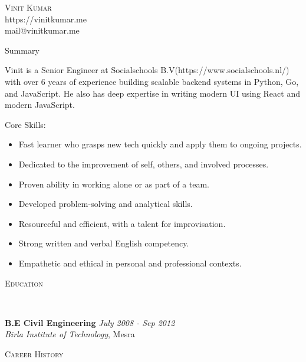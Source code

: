 \documentclass[9pt]{article}
\newenvironment{changemargin}[2]{%
  \begin{list}{}{%
    \setlength{\topsep}{0pt}%
    \setlength{\leftmargin}{#1}%
    \setlength{\rightmargin}{#2}%
    \setlength{\listparindent}{\parindent}%
    \setlength{\itemindent}{\parindent}%
    \setlength{\parsep}{\parskip}%
  }%
  \item[]}{\end{list}
}
\newcommand{\lineover}{
    \begin{changemargin}{-0.05in}{-0.05in}
        \vspace*{-8pt}
        \hrulefill \\
        \vspace*{-2pt}
    \end{changemargin}
}
\newcommand{\header}[1]{
    \begin{changemargin}{-0.5in}{-0.5in}
        \scshape{#1}\\
    \lineover
    \end{changemargin}
}
\newcommand{\contact}[4]{
    \begin{changemargin}{-0.5in}{-0.5in}
        \begin{center}
            {\Large \scshape {#1}}\\ \smallskip
            {#2}\\ \smallskip
            {#3}\\ \smallskip
            {#4}\smallskip
        \end{center}
    \end{changemargin}
}
\newenvironment{body} {
    \vspace*{-16pt}
    \begin{changemargin}{-0.25in}{-0.5in}
  }
    {\end{changemargin}
}
\begin{document}
\contact{Vinit Kumar}{https://vinitkumar.me}{mail@vinitkumar.me}


\header{Summary}

\begin{body}
    \vspace{14pt}
Vinit is a Senior Engineer at Socialschools B.V(https://www.socialschools.nl/) with over 6 years of experience building scalable backend systems in Python, Go, and JavaScript. He also has deep expertise in writing modern UI using React and modern JavaScript.


Core Skills:
\begin{itemize} \itemsep -0pt
    \item Fast learner who grasps new tech quickly and apply them to ongoing projects.
    \item Dedicated to the improvement of self, others, and involved processes.
    \item Proven ability in working alone or as part of a team.
    \item Developed problem-solving and analytical skills.
    \item Resourceful and efficient, with a talent for improvisation.
    \item Strong written and verbal English competency.
    \item Empathetic and ethical in personal and professional contexts.
\end{itemize}

\end{body}

\smallskip


\header{Education}

\begin{body}
    \vspace{14pt}
    \textbf{B.E Civil Engineering }{} \hfill \emph{July 2008 - Sep 2012}{} \\
    \emph{Birla Institute of Technology}, Mesra{} \\
\end{body}

\smallskip


\header{Career History}
\end{document}
